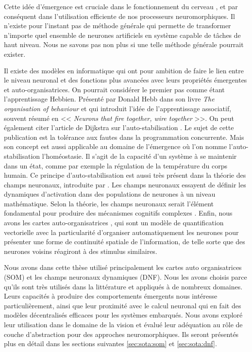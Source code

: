 	Cette idée d'émergence est cruciale dans le fonctionnement du cerveau \cite{turkheimer2019conflicting}, et par conséquent dans l'utilisation efficiente de nos processeurs neuromorphiques. Il n'existe pour l'instant pas de méthode générale qui permette de transformer n'importe quel ensemble de neurones artificiels en système capable de tâches de haut niveau. Nous ne savons pas non plus si une telle méthode générale pourrait exister.

	Il existe des modèles en informatique qui ont pour ambition de faire le lien entre le niveau neuronal et des fonctions plus avancées avec leurs propriétés émergentes et auto-organisatrices. On pourrait considérer le premier pas comme étant l'apprentissage Hebbien. Présenté par Donald Hebb dans son livre \textit{The organisation of behaviour} \cite{hebb1949organisation} et qui introduit l'idée de l'apprentissage associatif, souvent résumé en << \textit{Neurons that fire together, wire together} >>. On peut également citer l'article de Dijkstra sur l'auto-stabilisation \cite{dijkstra1982self}. Le sujet de cette publication est la tolérance aux fautes dans la programmation concurrente. Mais son concept est aussi applicable au domaine de l'émergence où l'on nomme l'auto-stabilisation l'homéostasie. Il s'agit de la capacité d'un système à se maintenir dans un état, comme par exemple la régulation de la température du corps humain. Ce principe d'auto-stabilisation est aussi très présent dans la théorie des champs neuronaux, introduite par \cite{amari1977dynamics}. Les champs neuronaux essayent de définir les dynamiques d'activation dans des populations de neurones à un niveau mathématique. Selon la théorie, les champs neuronaux serait l'élément fondamental pour produire des mécanismes cognitifs complexes \cite{sandamirskaya2014dynamic}. Enfin, nous avons les cartes auto-organisatrices \cite{kohonen-som82}, qui sont un modèle de quantification vectorielle avec la particularité d'organiser automatiquement les neurones pour présenter une forme de continuité spatiale de l'information, de telle sorte que des neurones voisins réagiront à des stimulus similaires.

	Nous avons dans cette thèse utilisé principalement les cartes auto organisatrices (SOM) et les champs neuronaux dynamiques (DNF). Nous les avons choisis parce qu'ils sont très utilisés dans la littérature et appliqués à de nombreux domaines. Leurs capacités à produire des comportements émergents nous intéresse particulièrement, ainsi que leur proximité avec le calcul neuronal qui en fait des modèles décentralisés efficaces pour les systèmes embarqués. Nous avons exploré leur utilisation dans le domaine de la vision et évalué leur adéquation au rôle de couche d'abstraction pour des approches neuromorphiques. Ils seront présentés plus en détail dans les sections suivantes \ref{sec:sota:som} et \ref{sec:sota:dnf}.

